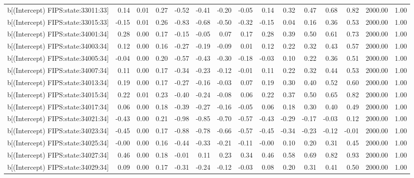 \begin{table}[ht]
\begin{tabular}{rrrrrrrrrrrrrrr}
  b[(Intercept) FIPS:state:33011:33] & 0.14 & 0.01 & 0.27 & -0.52 & -0.41 & -0.20 & -0.05 & 0.14 & 0.32 & 0.47 & 0.68 & 0.82 & 2000.00 & 1.00 \\ 
  b[(Intercept) FIPS:state:33015:33] & -0.15 & 0.01 & 0.26 & -0.83 & -0.68 & -0.50 & -0.32 & -0.15 & 0.04 & 0.16 & 0.36 & 0.53 & 2000.00 & 1.00 \\ 
  b[(Intercept) FIPS:state:34001:34] & 0.28 & 0.00 & 0.17 & -0.15 & -0.05 & 0.07 & 0.17 & 0.28 & 0.39 & 0.50 & 0.61 & 0.73 & 2000.00 & 1.00 \\ 
  b[(Intercept) FIPS:state:34003:34] & 0.12 & 0.00 & 0.16 & -0.27 & -0.19 & -0.09 & 0.01 & 0.12 & 0.22 & 0.32 & 0.43 & 0.57 & 2000.00 & 1.00 \\ 
  b[(Intercept) FIPS:state:34005:34] & -0.04 & 0.00 & 0.20 & -0.57 & -0.43 & -0.30 & -0.18 & -0.03 & 0.10 & 0.22 & 0.36 & 0.51 & 2000.00 & 1.00 \\ 
  b[(Intercept) FIPS:state:34007:34] & 0.11 & 0.00 & 0.17 & -0.34 & -0.23 & -0.12 & -0.01 & 0.11 & 0.22 & 0.32 & 0.44 & 0.53 & 2000.00 & 1.00 \\ 
  b[(Intercept) FIPS:state:34013:34] & 0.19 & 0.00 & 0.17 & -0.27 & -0.16 & -0.03 & 0.07 & 0.19 & 0.30 & 0.40 & 0.52 & 0.60 & 2000.00 & 1.00 \\ 
  b[(Intercept) FIPS:state:34015:34] & 0.22 & 0.01 & 0.23 & -0.40 & -0.24 & -0.08 & 0.06 & 0.22 & 0.37 & 0.50 & 0.65 & 0.82 & 2000.00 & 1.00 \\ 
  b[(Intercept) FIPS:state:34017:34] & 0.06 & 0.00 & 0.18 & -0.39 & -0.27 & -0.16 & -0.05 & 0.06 & 0.18 & 0.30 & 0.40 & 0.49 & 2000.00 & 1.00 \\ 
  b[(Intercept) FIPS:state:34021:34] & -0.43 & 0.00 & 0.21 & -0.98 & -0.85 & -0.70 & -0.57 & -0.43 & -0.29 & -0.17 & -0.03 & 0.12 & 2000.00 & 1.00 \\ 
  b[(Intercept) FIPS:state:34023:34] & -0.45 & 0.00 & 0.17 & -0.88 & -0.78 & -0.66 & -0.57 & -0.45 & -0.34 & -0.23 & -0.12 & -0.01 & 2000.00 & 1.00 \\ 
  b[(Intercept) FIPS:state:34025:34] & -0.00 & 0.00 & 0.16 & -0.44 & -0.33 & -0.21 & -0.11 & -0.00 & 0.10 & 0.20 & 0.31 & 0.45 & 2000.00 & 1.00 \\ 
  b[(Intercept) FIPS:state:34027:34] & 0.46 & 0.00 & 0.18 & -0.01 & 0.11 & 0.23 & 0.34 & 0.46 & 0.58 & 0.69 & 0.82 & 0.93 & 2000.00 & 1.00 \\ 
  b[(Intercept) FIPS:state:34029:34] & 0.09 & 0.00 & 0.17 & -0.31 & -0.24 & -0.12 & -0.03 & 0.08 & 0.20 & 0.31 & 0.41 & 0.50 & 2000.00 & 1.00 \\ 

\end{tabular}
\end{table}
